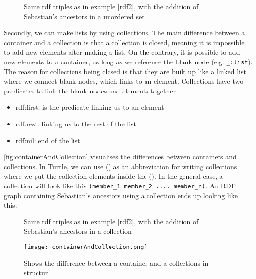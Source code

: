\begin{figure}[h]
    \begin{example}
        Same rdf triples as in example \ref{rdf2}, with the addition of Sebastian's ancestors in a unordered set
    \end{example}
    
\end{figure}

\para
Secondly, we can make lists by using collections. The main difference between a container and a collection is that a collection is closed, meaning it is impossible to add new elements after making a list. On the contrary, it is possible to add new elements to a container, as long as we reference the blank node (e.g. \lstinline{_:list}). The reason for collections being closed is that they are built up like a linked list where we connect blank nodes, which links to an element. Collections have two predicates to link the blank nodes and elements together. 

\begin{itemize}
    \item rdf:first: is the predicate linking us to an element
    \item rdf:rest: linking us to the rest of the list
    \item rdf:nil: end of the list
\end{itemize}

\para
\autoref{fig:containerAndCollection} visualises the differences between containers and collections. In Turtle, we can use () as an abbreviation for writing collections where we put the collection elements inside the (). In the general case, a collection will look like this \lstinline{(member_1 member_2 .... member_n)}. An RDF graph containing Sebastian's ancestors using a collection ends up looking like this:

\begin{figure}[h]
    \begin{example}
        Same rdf triples as in example \ref{rdf2}, with the addition of Sebastian's ancestors in a collection
    \end{example}
    
\end{figure}


\begin{figure}
    \centering
    \texttt{[image: containerAndCollection.png]}
    \caption{Shows the difference between a container and a collections in structur}
    \label{fig:containerAndCollection}
\end{figure}

